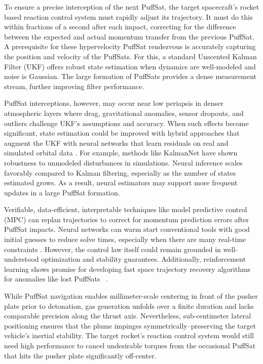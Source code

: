 \documentclass{article}
\begin{document}
To ensure a precise interception of the next PuffSat, the target spacecraft's rocket based reaction control system must rapidly adjust its trajectory. It must do this within fractions of a second after each impact, correcting for the difference between the expected and actual momentum transfer from the previous PuffSat.  A prerequisite for these hypervelocity PuffSat rendezvous is accurately capturing the position and velocity of the PuffSats.  For this, a standard Unscented Kalman Filter (UKF) \cite{wan2000unscented} offers robust state estimation when dynamics are well-modeled and noise is Gaussian.  The large formation of PuffSats provides a dense measurement stream, further improving filter performance.  

PuffSat interceptions, however, may occur near low periapsis in denser atmospheric layers where drag, gravitational anomalies, sensor dropouts, and outliers challenge UKF's assumptions and accuracy.  When such effects become significant, state estimation could be improved with hybrid approaches that augment the UKF with neural networks that learn residuals on real and simulated orbital data \cite{takigawa2023comparison}.  For example, methods like KalmanNet \cite{revach_2022_kalmannet} \cite{revach2022unsupervised} have shown robustness to unmodeled disturbances in simulations.  Neural inference scales favorably compared to Kalman filtering, especially as the number of states estimated grows.  As a result, neural estimators may support more frequent updates in a large PuffSat formation.  

Verifiable, data-efficient, interpretable techniques like model predictive control (MPC) can replan trajectories to correct for momentum prediction errors after PuffSat impacts.  Neural networks can  warm start conventional tools with good initial guesses to reduce solve times, \cite{guffanti2024transformerstrajectoryoptimizationapplication} especially when there are many real-time constraints  \cite{briden_constraint}.  However, the control law itself could remain grounded in well-understood optimization and stability guarantees.     Additionally, reinforcement learning shows promise for developing fast space trajectory recovery algorithms for anomalies like lost PuffSats \ \cite{zavoli2021reinforcement}.  

While PuffSat navigation enables millimeter-scale centering in front of the pusher plate prior to detonation, gas generation unfolds over a finite duration and lacks comparable precision along the thrust axis. Nevertheless, sub-centimeter lateral positioning ensures that the plume impinges symmetrically--preserving the target vehicle’s inertial stability.  The target rocket's reaction control system would still need high performance to cancel undesirable torques from the occasional PuffSat that hits the pusher plate significantly off-center.
\end{document}
